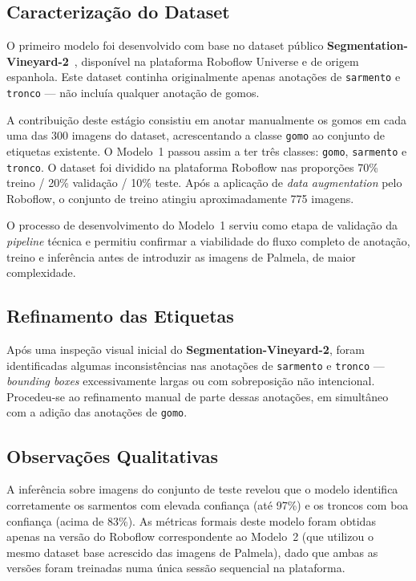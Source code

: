 \subsection{Caracterização do Dataset}

O primeiro modelo foi desenvolvido com base no dataset público
\textbf{Segmentation-Vineyard-2}~\cite{vinya2024segvineyard}, disponível na
plataforma Roboflow Universe e de origem espanhola. Este dataset continha
originalmente apenas anotações de \texttt{sarmento} e \texttt{tronco} —
não incluía qualquer anotação de gomos.

A contribuição deste estágio consistiu em anotar manualmente os
gomos em cada uma das 300 imagens do dataset, acrescentando a classe
\texttt{gomo} ao conjunto de etiquetas existente. O Modelo~1 passou assim
a ter três classes: \texttt{gomo}, \texttt{sarmento} e \texttt{tronco}.
O dataset foi dividido na plataforma Roboflow nas proporções
70\% treino / 20\% validação / 10\% teste. Após a aplicação de
\textit{data augmentation} pelo Roboflow, o conjunto de treino
atingiu aproximadamente 775 imagens.

O processo de desenvolvimento do Modelo~1 serviu como etapa de validação
da \textit{pipeline} técnica e permitiu confirmar a viabilidade do fluxo
completo de anotação, treino e inferência antes de introduzir as imagens
de Palmela, de maior complexidade.

\subsection{Refinamento das Etiquetas}

Após uma inspeção visual inicial do \textbf{Segmentation-Vineyard-2}, foram identificadas
algumas inconsistências nas anotações de \texttt{sarmento} e \texttt{tronco}
— \textit{bounding boxes} excessivamente largas ou com sobreposição não
intencional. Procedeu-se ao refinamento manual de parte dessas anotações,
em simultâneo com a adição das anotações de \texttt{gomo}.

\subsection{Observações Qualitativas}

A inferência sobre imagens do conjunto de teste revelou que o modelo
identifica corretamente os sarmentos com elevada confiança (até 97\%)
e os troncos com boa confiança (acima de 83\%). As métricas formais
deste modelo foram obtidas apenas na versão do Roboflow correspondente
ao Modelo~2 (que utilizou o mesmo dataset base acrescido das imagens de
Palmela), dado que ambas as versões foram treinadas numa única sessão
sequencial na plataforma.

